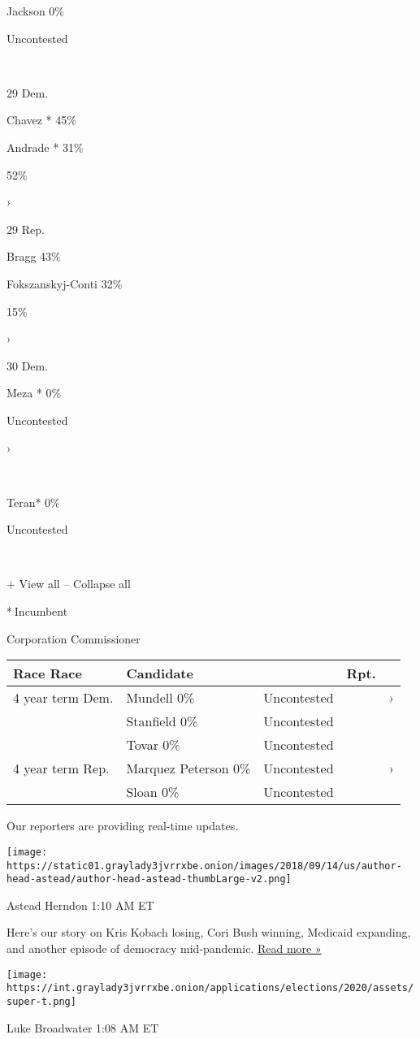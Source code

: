 Jackson 0\%

Uncontested

~

29 Dem.

Chavez * 45\%

Andrade * 31\%

52\%

›

29 Rep.

Bragg 43\%

Fokszanskyj-Conti 32\%

15\%

›

30 Dem.

Meza * 0\%

Uncontested

›

~

Teran* 0\%

Uncontested

~

+ View all -- Collapse all

* Incumbent~

Corporation Commissioner

\begin{longtable}[]{@{}lllll@{}}
\toprule
Race Race & Candidate & & Rpt. &\tabularnewline
\midrule
\endhead
4 year term Dem. & Mundell 0\% & Uncontested & & ›\tabularnewline
& Stanfield 0\% & Uncontested & &\tabularnewline
& Tovar 0\% & Uncontested & &\tabularnewline
4 year term Rep. & Marquez Peterson 0\% & Uncontested & &
›\tabularnewline
& Sloan 0\% & Uncontested & &\tabularnewline
\bottomrule
\end{longtable}

Our reporters are providing real-time updates.

\texttt{[image: https://static01.graylady3jvrrxbe.onion/images/2018/09/14/us/author-head-astead/author-head-astead-thumbLarge-v2.png]}

Astead Herndon 1:10 AM ET

Here's our story on Kris Kobach losing, Cori Bush winning, Medicaid
expanding, and another episode of democracy mid-pandemic.
\href{https://www.nytimes3xbfgragh.onion/2020/08/04/us/politics/kobach-tlaib.html?action=click\&module=ELEX_results\&pgtype=Interactive\&region=ReporterUpdates}{Read
more »}

\texttt{[image: https://int.graylady3jvrrxbe.onion/applications/elections/2020/assets/super-t.png]}

Luke Broadwater 1:08 AM ET

